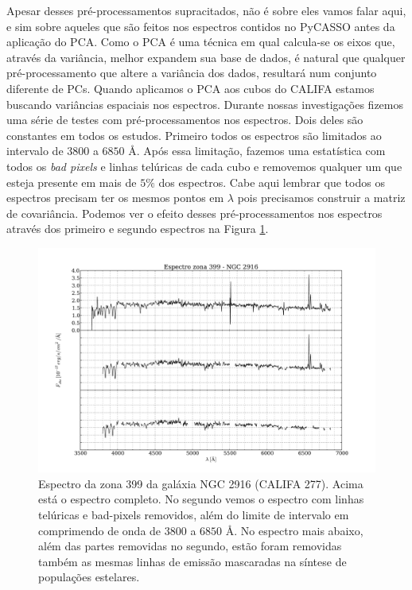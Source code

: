 Apesar desses pré-processamentos supracitados, não é sobre eles vamos falar aqui, e sim sobre aqueles que são feitos nos
espectros contidos no PyCASSO antes da aplicação do PCA. Como o PCA é uma técnica em qual calcula-se os eixos que,
através da variância, melhor expandem sua base de dados, é natural que qualquer pré-processamento que altere a variância
dos dados, resultará num conjunto diferente de PCs. Quando aplicamos o PCA aos cubos do CALIFA estamos buscando
variâncias espaciais nos espectros. Durante nossas investigações fizemos uma série de testes com pré-processamentos nos
espectros. Dois deles são constantes em todos os estudos. Primeiro todos os espectros são limitados ao intervalo de
$3800$ a $6850$ \AA. Após essa limitação, fazemos uma estatística com todos os {\em bad pixels} e linhas telúricas de
cada cubo e removemos qualquer um que esteja presente em mais de $5\%$ dos espectros. Cabe aqui lembrar que todos os
espectros precisam ter os mesmos pontos em $\lambda$ pois precisamos construir a matriz de covariância. Podemos ver o
efeito desses pré-processamentos nos espectros através dos primeiro e segundo espectros na Figura
\ref{fig:UsoPCA:checkmask}.

\begin{figure}
    \includegraphics[width=1.0\textwidth]{figuras/K0277-constant_inital_mask-399.pdf}
    \caption[Exemplo de máscaras em um espectro do cubo de dados.]
    {Espectro da zona 399 da galáxia NGC 2916 (CALIFA 277). Acima está o espectro completo. No segundo vemos o espectro
    com linhas telúricas e bad-pixels removidos, além do limite de intervalo em comprimendo de onda de $3800$ a $6850$
    \AA. No espectro mais abaixo, além das partes removidas no segundo, estão foram removidas também as mesmas linhas de
    emissão mascaradas na síntese de populações estelares.}
    \label{fig:UsoPCA:checkmask}
\end{figure}

